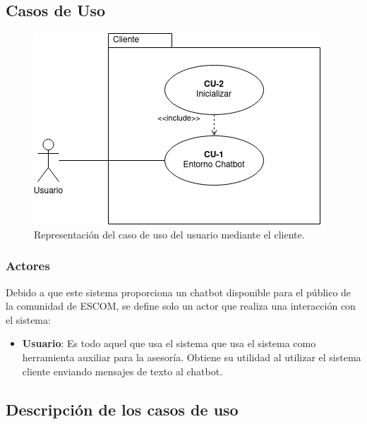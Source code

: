\subsection{Casos de Uso}

\begin{figure}[ht]
    \centering
    \includegraphics[scale=0.61]{images/5/casos-de-uso}
    \caption{Representación del caso de uso del usuario mediante el cliente.}
    \label{fig:diagrama-casos-de-uso} 
\end{figure}

\subsubsection{Actores}

Debido a que este sistema proporciona un chatbot disponible para el público de la comunidad de ESCOM, se define solo un actor que realiza una interacción con el sistema:

\begin{itemize}
    \item \textbf{Usuario}: Es todo aquel que usa el sistema que usa el sistema como herramienta auxiliar para la asesoría. Obtiene su utilidad al utilizar el sistema cliente enviando mensajes de texto al chatbot.
\end{itemize}

\subsection{Descripción de los casos de uso}

